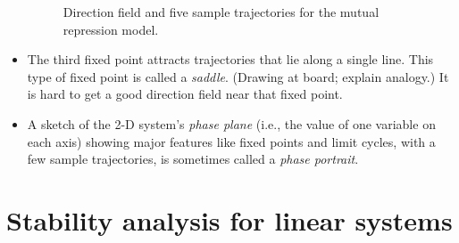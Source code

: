 \documentclass{article}
\begin{document}
\begin{itemize}

\begin{figure}[htp] 
\caption{Direction field and five sample trajectories for the mutual repression model.} \label{fig:mr}
\end{figure}  

\item The third fixed point attracts trajectories that lie along a single line. This type of fixed point is called a \textit{saddle}. (Drawing at board; explain analogy.) It is hard to get a good direction field near that fixed point.

\item A sketch of the 2-D system's \textit{phase plane} (i.e., the value of one variable on each axis) showing major features like fixed points and limit cycles, with a few sample trajectories, is sometimes called a \textit{phase portrait}.

\end{itemize}

\section*{Stability analysis for linear systems}
\end{document}
